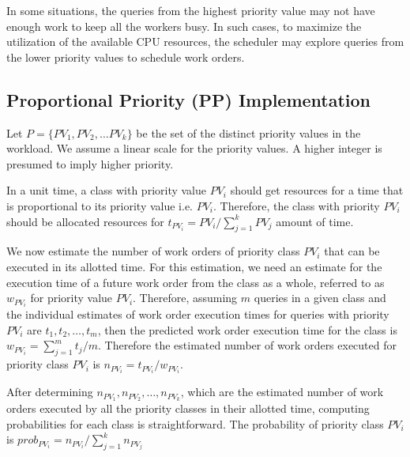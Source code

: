 
In some situations, the queries from the highest priority value may not have enough work to keep all the workers busy. 
In such cases, to maximize the utilization of the available CPU resources, the 
scheduler may explore queries from the lower priority values to schedule work orders.
\subsection{Proportional Priority (PP) Implementation}\label{ssec:proportional-priority}
Let $P = \{PV_{1}, PV_{2}, \ldots PV_{k}\}$ be the set of the distinct priority values 
in the workload. 
We assume a linear scale for the priority values. 
A higher integer is presumed to imply higher priority.

In a unit time, a class with priority value $PV_{i}$ should get resources for a time that is 
proportional to its priority value i.e. $PV_{i}$. 
Therefore, the class with priority $PV_{i}$ should be allocated resources for 
$t_{PV_{i}} = PV_{i}/\sum\limits_{j = 1}^{k}PV_{j}$ amount of time. 

We now estimate the number of work orders of priority class $PV_{i}$ that can be executed in its allotted time. 
For this estimation, we need an estimate for the execution time of a future work order from the class as a whole, referred to as $w_{PV_{i}}$ for priority value $PV_{i}$.
Therefore, assuming $m$ queries in a given class and the individual estimates of 
work order execution times for queries with priority $PV_{i}$ are $t_{1}, t_{2}, \ldots, t_{m}$, then the predicted work order execution time for the class is $w_{PV_{i}} = \sum\limits_{j = 1}^{m}t_{j}/m$.
Therefore the estimated number of work orders executed for priority class $PV_{i}$ is
$n_{PV_{i}} = t_{PV_{i}} / w_{PV_{i}}$.

After determining $n_{PV_{1}}, n_{PV_{2}}, \ldots, n_{PV_{k}}$, which are the 
estimated number of work orders executed by all the priority classes in their allotted
time, computing probabilities for each class is straightforward.
The probability of priority class $PV_{i}$ is 
$prob_{PV_{i}} = n_{PV_{i}}/\sum\limits_{j = 1}^{k}n_{PV_{j}}$


